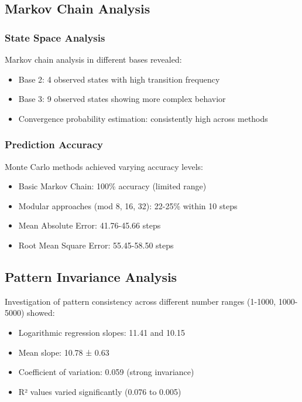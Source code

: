 \documentclass[12pt,a4paper]{article}
\begin{document}
\subsection{Markov Chain Analysis}

\subsubsection{State Space Analysis}

Markov chain analysis in different bases revealed:
\begin{itemize}
\item Base 2: 4 observed states with high transition frequency
\item Base 3: 9 observed states showing more complex behavior
\item Convergence probability estimation: consistently high across methods
\end{itemize}

\subsubsection{Prediction Accuracy}

Monte Carlo methods achieved varying accuracy levels:
\begin{itemize}
\item Basic Markov Chain: 100\% accuracy (limited range)
\item Modular approaches (mod 8, 16, 32): 22-25\% within 10 steps
\item Mean Absolute Error: 41.76-45.66 steps
\item Root Mean Square Error: 55.45-58.50 steps
\end{itemize}

\subsection{Pattern Invariance Analysis}

Investigation of pattern consistency across different number ranges (1-1000, 1000-5000) showed:
\begin{itemize}
\item Logarithmic regression slopes: 11.41 and 10.15
\item Mean slope: 10.78 ± 0.63
\item Coefficient of variation: 0.059 (strong invariance)
\item R² values varied significantly (0.076 to 0.005)
\end{itemize}
\end{document}
